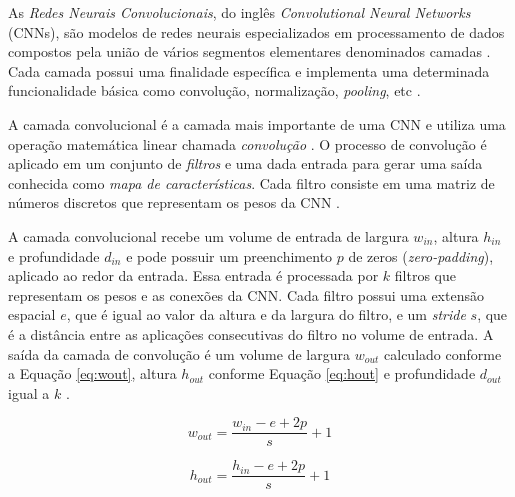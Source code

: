As \textit{Redes Neurais Convolucionais}, do inglês \textit{Convolutional Neural Networks} (CNNs), são modelos de redes neurais especializados em processamento de dados compostos pela união de vários segmentos elementares denominados camadas \cite{ref:goodfellow}. Cada camada possui uma finalidade específica e implementa uma determinada funcionalidade básica como convolução, normalização, \textit{pooling}, etc \cite{ref:khan}.

A camada convolucional é a camada mais importante de uma CNN e utiliza uma operação matemática linear chamada \textit{convolução} \cite{ref:goodfellow}. O processo de convolução é aplicado em um conjunto de \textit{filtros} e uma dada entrada para gerar uma saída conhecida como \textit{mapa de características}. Cada filtro consiste em uma matriz de números discretos que representam os pesos da CNN \cite{ref:khan}.



A camada convolucional recebe um volume de entrada de largura $w_{in}$, altura $h_{in}$ e profundidade $d_{in}$ e pode possuir um preenchimento  $p$ de zeros (\textit{zero-padding}), aplicado ao redor da entrada. Essa entrada é processada por $k$ filtros que representam os pesos e as conexões da CNN. Cada filtro possui uma extensão espacial $e$, que é igual ao valor da altura e da largura do filtro, e um \textit{stride} $s$, que é a distância entre as aplicações consecutivas do filtro no volume de entrada. A saída da camada de convolução é um volume de largura $w_{out}$ calculado conforme a Equação \ref{eq:wout}, altura $h_{out}$ conforme Equação \ref{eq:hout}  e profundidade $d_{out}$ igual a $k$ \cite{ref:buduma}. 

\begin{equation}
w_{out} = \frac{w_{in} - e + 2p}{s} +1 \label{eq:wout}
\end{equation}

\begin{equation}
h_{out} = \frac{h_{in} - e + 2p}{s} +1 \label{eq:hout}
\end{equation}